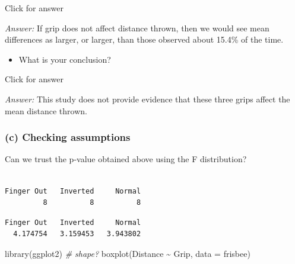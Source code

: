 \documentclass[
]{book}
\newenvironment{Shaded}{\begin{snugshade}}{\end{snugshade}}
\newcommand{\AttributeTok}[1]{\textcolor[rgb]{0.77,0.63,0.00}{#1}}
\newcommand{\CommentTok}[1]{\textcolor[rgb]{0.56,0.35,0.01}{\textit{#1}}}
\newcommand{\FunctionTok}[1]{\textcolor[rgb]{0.00,0.00,0.00}{#1}}
\newcommand{\NormalTok}[1]{#1}
\newcommand{\SpecialCharTok}[1]{\textcolor[rgb]{0.00,0.00,0.00}{#1}}
\providecommand{\tightlist}{%
  \setlength{\itemsep}{0pt}\setlength{\parskip}{0pt}}
\begin{document}
Click for answer

\emph{Answer:} If grip does not affect distance thrown, then we would see mean differences as larger, or larger, than those observed about 15.4\% of the time.

\begin{itemize}
\tightlist
\item
  What is your conclusion?
\end{itemize}

Click for answer

\emph{Answer:} This study does not provide evidence that these three grips affect the mean distance thrown.

\hypertarget{c-checking-assumptions}{%
\subsubsection{(c) Checking assumptions}\label{c-checking-assumptions}}

Can we trust the p-value obtained above using the F distribution?

\begin{Shaded}
\end{Shaded}

\begin{verbatim}

Finger Out   Inverted     Normal 
         8          8          8 
\end{verbatim}

\begin{Shaded}
\end{Shaded}

\begin{verbatim}
Finger Out   Inverted     Normal 
  4.174754   3.159453   3.943802 
\end{verbatim}

\begin{Shaded}
\begin{Highlighting}[]
\FunctionTok{library}\NormalTok{(ggplot2)  }\CommentTok{\# shape?}
\FunctionTok{boxplot}\NormalTok{(Distance }\SpecialCharTok{\textasciitilde{}}\NormalTok{ Grip, }\AttributeTok{data =}\NormalTok{ frisbee)}
\end{Highlighting}
\end{Shaded}
\end{document}
